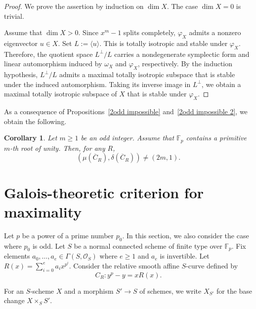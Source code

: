 \documentclass[12pt,a4paper]{amsart}
\newtheorem{corollary}[theorem]{Corollary}
\theoremstyle{definition}
\def\F{{\mathbb F}}
\theoremstyle{remark}
\begin{document}
\begin{proof}
We prove the assertion by induction on $\dim X$. The case $\dim X=0$ is trivial. 

Assume that $\dim X>0$. Since $x^m-1$ splits completely, $\varphi_X$ admits a nonzero eigenvector $u\in X$. Set $L:=\langle u\rangle$. This is totally isotropic and stable under $\varphi_X$. Therefore, the quotient space 
$L^\perp /L$ carries a nondegenerate symplectic form and linear automorphism induced by $\omega_X$ and $\varphi_X$, respectively. By the induction hypothesis, $L^\perp/L$ admits a maximal totally isotropic subspace that is stable under the induced automorphism. Taking its inverse image in $L^\perp$, we obtain a maximal totally isotropic subspace of $X$ that is stable under $\varphi_X$. 
\end{proof}

As a consequence of Propositions~\ref{2odd impossible} and~\ref{2odd impossible 2}, we obtain the following. 
\begin{corollary}\label{lasc}
Let $m\geq1$ be an odd integer. Assume that $\F_p$ contains a primitive $m$-th root of unity. Then, for any $R$, 
\[
(\mu(\overline{C}_R),\delta(\overline{C}_R))\neq(2m,1). 
\]
\end{corollary}

 

 
   





\appendix

\section{Galois-theoretic criterion for maximality}
\label{Gal}

Let $p$ be a power of a prime number $p_0$. In this section, we also consider the case where $p_0$ is odd. Let $S$ be a normal connected scheme of finite type over $\mathbb{F}_{p}$. Fix elements $a_0,\dots,a_e\in \Gamma(S,{\mathcal O}_S)$ where $e\geq1$ and $a_e$ is invertible. Let $R(x)=\sum_{i=0}^ea_ix^{p^i}$. Consider the relative smooth affine $S$-curve defined by 
\[
C_R \colon y^p-y= xR(x). 
\]

For an $S$-scheme $X$ and a morphism $S'\to S$ of schemes, we write $X_{S'}$ for the base change $X\times_SS'$. 
\end{document}
